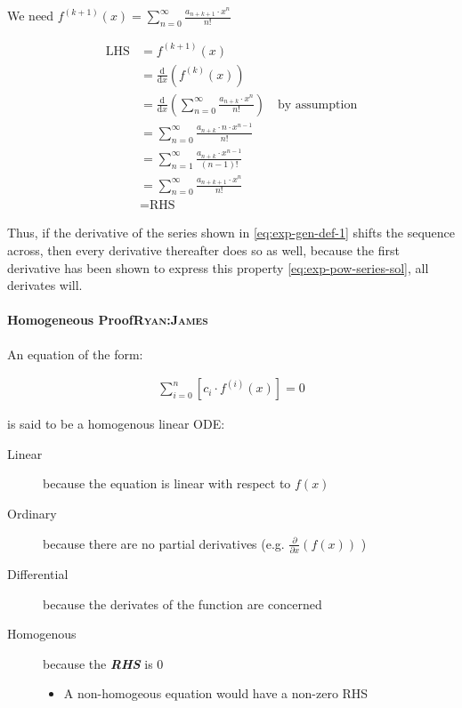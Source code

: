 \documentclass[11pt]{article}
\begin{document}
We need \(f^{(k+1)}(x) = \sum_{n=0}^\infty\frac{a_{n+k+1}\cdot x^n}{n!}\)

\begin{align*}
    \text{LHS} &= f^{(k+1)}(x)\\
    &= \frac{\mathrm{d}}{\mathrm{d}x}\left(f^{(k)}(x)\right)\\
    &= \frac{\mathrm{d}}{\mathrm{d}x}\left(\sum_{n=0}^\infty\frac{a_{n+k}\cdot x^n}{n!}\right)\quad \text{by assumption}\\
    &= \sum_{n=0}^\infty\frac{a_{n+k}\cdot n\cdot x^{n-1}}{n!}\\
    &= \sum_{n=1}^\infty\frac{a_{n+k}\cdot x^{n-1}}{(n-1)!}\\
    &= \sum_{n=0}^\infty\frac{a_{n+k+1}\cdot x^{n}}{n!}\\
    &= \text{RHS}
\end{align*}

Thus, if the derivative of the series shown in \eqref{eq:exp-gen-def-1} shifts the
sequence across, then every derivative thereafter does so as well, because the
first derivative has been shown to express this property
\eqref{eq:exp-pow-series-sol}, all derivates will.

\paragraph{Homogeneous Proof\hfill{}\textsc{Ryan:James}}
\label{sec:org24e118a}
An equation of the form:

\begin{align}
\sum^{n}_{i=0} \left[ c_{i} \cdot f^{(i)}(x) \right] = 0 \label{eq:hom-ode}
\end{align}

is said to be a homogenous linear ODE: \cite[Ch. 2]{zillDifferentialEquations2009a}

\begin{description}
\item[{Linear}] because the equation is linear with respect to \(f(x)\)
\item[{Ordinary}] because there are no partial derivatives (e.g. \(\frac{\partial }{\partial x}{\left({ f{\left({ x }\right)} }\right)}\)  )
\item[{Differential}] because the derivates of the function are concerned
\item[{Homogenous}] because the \textbf{\emph{RHS}} is 0
\begin{itemize}
\item A non-homogeous equation would have a non-zero RHS
\end{itemize}
\end{description}
\end{document}
